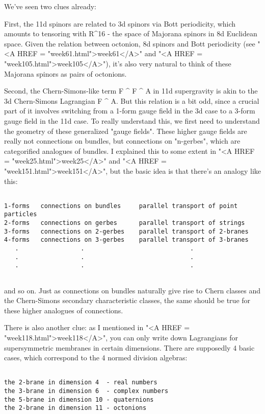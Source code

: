 We've seen two clues already: 
 
First, the 11d spinors are related to 3d spinors via Bott periodicity,
which amounts to tensoring with R^{16} - the space of Majorana spinors
in 8d Euclidean space.  Given the relation between octonion, 8d spinors
and Bott periodicity (see "<A HREF = "week61.html">week61</A>"
and "<A HREF = "week105.html">week105</A>"), it's also very
natural to think of these Majorana spinors as pairs of octonions.
 
Second, the Chern-Simons-like term F ^ F ^ A in 11d supergravity is akin
to the 3d Chern-Simons Lagrangian F ^ A.  But this relation is a bit
odd, since a crucial part of it involves switching from a 1-form gauge
field in the 3d case to a 3-form gauge field in the 11d case.  To really
understand this, we first need to understand the geometry of these
generalized "gauge fields".  These higher gauge fields are
really not connections on bundles, but connections on
"n-gerbes", which are categorified analogues of bundles.  I
explained this to some extent in "<A HREF =
"week25.html">week25</A>" and "<A HREF =
"week151.html">week151</A>", but the basic idea is that there's an
analogy like this:
 

\begin{verbatim}

1-forms   connections on bundles     parallel transport of point particles 
2-forms   connections on gerbes      parallel transport of strings 
3-forms   connections on 2-gerbes    parallel transport of 2-branes 
4-forms   connections on 3-gerbes    parallel transport of 3-branes 
   .                 .                             . 
   .                 .                             . 
   .                 .                             . 
 
\end{verbatim}
    
and so on.  Just as connections on bundles naturally give rise to 
Chern classes and the Chern-Simons secondary characteristic classes, 
the same should be true for these higher analogues of connections. 
 
There is also another clue: as I mentioned in "<A HREF =
"week118.html">week118</A>", you can only write down Lagrangians
for supersymmetric membranes in certain dimensions.  There are
supposedly 4 basic cases, which correspond to the 4 normed division
algebras:


\begin{verbatim}

the 2-brane in dimension 4  - real numbers
the 3-brane in dimension 6  - complex numbers
the 5-brane in dimension 10 - quaternions
the 2-brane in dimension 11 - octonions
\end{verbatim}
    

